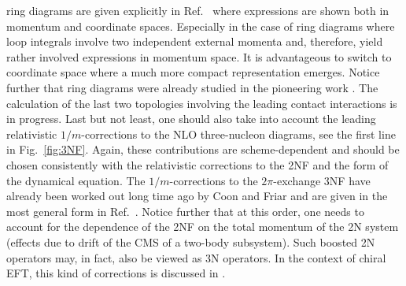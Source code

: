 \documentclass[aps,rmp,nofootinbib,twocolumn,floatfix]{revtex4}
\begin{document}
ring diagrams are given explicitly in Ref.~\cite{Bernard:2007sp} where expressions
 are shown  both in momentum and coordinate spaces. 
Especially in the case of
ring diagrams where loop integrals involve two independent external momenta
and, therefore, yield rather involved expressions in momentum space.  It is
advantageous to switch to coordinate space where a much more compact
representation emerges.  Notice further that ring
diagrams were already studied in the pioneering work \cite{Fujita:1962}. 
The  calculation  of the last two
topologies involving the leading contact interactions is in progress. 
Last but not least, one should also take into account the leading relativistic
$1/m$-corrections to the NLO three-nucleon diagrams, see the first line in
Fig.~\ref{fig:3NF}. Again, these contributions are scheme-dependent and should
be chosen consistently with the relativistic corrections to the 2NF and the
form of the dynamical equation. The $1/m$-corrections to the $2\pi$-exchange
3NF have already been 
worked out long time ago by Coon and Friar and are given in the most general
form in Ref.~\cite{Coon:1986kq}. Notice further that at this order, one 
needs to
account for the dependence of the 2NF on the total momentum of the 2N system
(effects due to drift of the CMS of a two-body subsystem). Such boosted 2N
operators may, in fact, also be viewed as
3N operators. In the context of chiral EFT, this kind of corrections is
discussed in \cite{Robilotta:2006xq}. 
\end{document}
